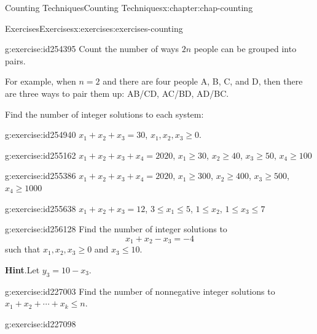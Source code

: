 \documentclass[oneside,10pt,]{book}
\newcommand{\blocktitlefont}{\relax}
\numberwithin{equation}{section}
\begin{document}
\begin{chapterptx}{Counting Techniques}{}{Counting Techniques}{}{}{x:chapter:chap-counting}
\begin{exercises-section}{Exercises}{}{Exercises}{}{}{x:exercises:exercises-counting}
\begin{divisionexercise}{18}{}{}{g:exercise:id254395}%
Count the number of ways \(2n\) people can be grouped into pairs.%
\par
For example, when \(n = 2\) and there are four people A, B, C, and D, then there are three ways to pair them up: AB\slash{}CD, AC\slash{}BD, AD\slash{}BC.%
\end{divisionexercise}%
\par\medskip\noindent%
%
Find the number of integer solutions to each system:%
\begin{exercisegroup}
\begin{divisionexerciseeg}{19}{}{}{g:exercise:id254940}%
\(x_1 + x_2 + x_3 = 30\), \(x_1, x_2, x_3 \geq 0\).%
\end{divisionexerciseeg}%
\begin{divisionexerciseeg}{20}{}{}{g:exercise:id255162}%
\(x_1 + x_2 + x_3 + x_4 = 2020\), \(x_1 \geq 30\), \(x_2 \geq 40\), \(x_3 \geq 50\), \(x_4 \geq 100\)%
\end{divisionexerciseeg}%
\begin{divisionexerciseeg}{21}{}{}{g:exercise:id255386}%
\(x_1 + x_2 + x_3 + x_4 = 2020\), \(x_1 \geq 300\), \(x_2 \geq 400\), \(x_3 \geq 500\), \(x_4 \geq 1000\)%
\end{divisionexerciseeg}%
\begin{divisionexerciseeg}{22}{}{}{g:exercise:id255638}%
\(x_1 + x_2 + x_3 = 12\), \(3 \leq x_1 \leq 5\), \(1 \leq x_2\), \(1 \leq x_3 \leq 7\)%
\end{divisionexerciseeg}%
\end{exercisegroup}
\par\medskip\noindent
\begin{divisionexercise}{23}{}{}{g:exercise:id256128}%
Find the number of integer solutions to%
\begin{equation*}
x_1 + x_2 - x_3 = -4
\end{equation*}
such that \(x_1, x_2, x_3 \geq 0\) and \(x_3 \leq 10\).%
\par\smallskip%
\noindent\textbf{\blocktitlefont Hint}.\hypertarget{g:hint:id226912}{}\quad{}Let \(y_3 = 10 - x_3\).%
\end{divisionexercise}%
\begin{divisionexercise}{24}{}{}{g:exercise:id227003}%
Find the number of nonnegative integer solutions to \(x_1 + x_2 + \cdots + x_k \leq n\).%
\end{divisionexercise}%
\begin{divisionexercise}{25}{}{}{g:exercise:id227098}%

\end{divisionexercise}
\end{exercises-section}
\end{chapterptx}
\end{document}
